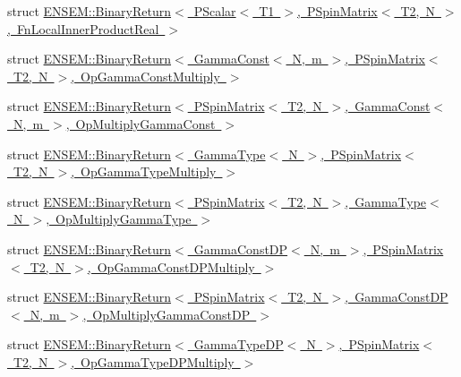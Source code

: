 \begin{DoxyCompactItemize}
\item 
struct \mbox{\hyperlink{structENSEM_1_1BinaryReturn_3_01PScalar_3_01T1_01_4_00_01PSpinMatrix_3_01T2_00_01N_01_4_00_01FnLocalInnerProductReal_01_4}{E\+N\+S\+E\+M\+::\+Binary\+Return$<$ P\+Scalar$<$ T1 $>$, P\+Spin\+Matrix$<$ T2, N $>$, Fn\+Local\+Inner\+Product\+Real $>$}}
\item 
struct \mbox{\hyperlink{structENSEM_1_1BinaryReturn_3_01GammaConst_3_01N_00_01m_01_4_00_01PSpinMatrix_3_01T2_00_01N_01_4_00_01OpGammaConstMultiply_01_4}{E\+N\+S\+E\+M\+::\+Binary\+Return$<$ Gamma\+Const$<$ N, m $>$, P\+Spin\+Matrix$<$ T2, N $>$, Op\+Gamma\+Const\+Multiply $>$}}
\item 
struct \mbox{\hyperlink{structENSEM_1_1BinaryReturn_3_01PSpinMatrix_3_01T2_00_01N_01_4_00_01GammaConst_3_01N_00_01m_01_4_00_01OpMultiplyGammaConst_01_4}{E\+N\+S\+E\+M\+::\+Binary\+Return$<$ P\+Spin\+Matrix$<$ T2, N $>$, Gamma\+Const$<$ N, m $>$, Op\+Multiply\+Gamma\+Const $>$}}
\item 
struct \mbox{\hyperlink{structENSEM_1_1BinaryReturn_3_01GammaType_3_01N_01_4_00_01PSpinMatrix_3_01T2_00_01N_01_4_00_01OpGammaTypeMultiply_01_4}{E\+N\+S\+E\+M\+::\+Binary\+Return$<$ Gamma\+Type$<$ N $>$, P\+Spin\+Matrix$<$ T2, N $>$, Op\+Gamma\+Type\+Multiply $>$}}
\item 
struct \mbox{\hyperlink{structENSEM_1_1BinaryReturn_3_01PSpinMatrix_3_01T2_00_01N_01_4_00_01GammaType_3_01N_01_4_00_01OpMultiplyGammaType_01_4}{E\+N\+S\+E\+M\+::\+Binary\+Return$<$ P\+Spin\+Matrix$<$ T2, N $>$, Gamma\+Type$<$ N $>$, Op\+Multiply\+Gamma\+Type $>$}}
\item 
struct \mbox{\hyperlink{structENSEM_1_1BinaryReturn_3_01GammaConstDP_3_01N_00_01m_01_4_00_01PSpinMatrix_3_01T2_00_01N_01fb4087ee38fd52097a0becc587302e6f}{E\+N\+S\+E\+M\+::\+Binary\+Return$<$ Gamma\+Const\+D\+P$<$ N, m $>$, P\+Spin\+Matrix$<$ T2, N $>$, Op\+Gamma\+Const\+D\+P\+Multiply $>$}}
\item 
struct \mbox{\hyperlink{structENSEM_1_1BinaryReturn_3_01PSpinMatrix_3_01T2_00_01N_01_4_00_01GammaConstDP_3_01N_00_01m_01fc91b4deeb7eab4452a6a4224b8c6fde}{E\+N\+S\+E\+M\+::\+Binary\+Return$<$ P\+Spin\+Matrix$<$ T2, N $>$, Gamma\+Const\+D\+P$<$ N, m $>$, Op\+Multiply\+Gamma\+Const\+D\+P $>$}}
\item 
struct \mbox{\hyperlink{structENSEM_1_1BinaryReturn_3_01GammaTypeDP_3_01N_01_4_00_01PSpinMatrix_3_01T2_00_01N_01_4_00_01OpGammaTypeDPMultiply_01_4}{E\+N\+S\+E\+M\+::\+Binary\+Return$<$ Gamma\+Type\+D\+P$<$ N $>$, P\+Spin\+Matrix$<$ T2, N $>$, Op\+Gamma\+Type\+D\+P\+Multiply $>$}}

\end{DoxyCompactItemize}
